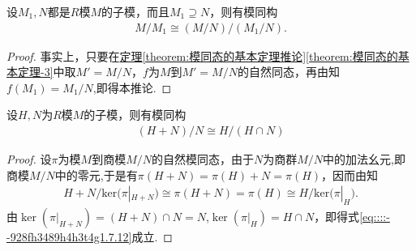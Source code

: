 \documentclass[../../main.tex]{subfiles}%
\begin{document}
\begin{corollary}
设$M_1, N$都是$R$模$M$的子模，而且$M_1 \supseteq N$，则有模同构\begin{align*}
M/M_1\cong (M/N)/(M_1/N).
\end{align*}
\end{corollary}
\begin{proof}

事实上，只要在\hyperref[theorem:模同态的基本定理推论]{定理\ref{theorem:模同态的基本定理推论}\ref{theorem:模同态的基本定理-3}}中取$M' = M/N$，$f$为$M$到$M' = M/N$的自然同态，再由知$f(M_1)=M_1/N$,即得本推论.

\end{proof}

\begin{theorem}
设$H, N$为$R$模$M$的子模，则有模同构
\begin{align}
(H + N)/N \cong H/(H \cap N) \label{eq::::--928fh3489h4h3t4g1.7.12}
\end{align}
\end{theorem}

\begin{proof}

设$\pi$为模$M$到商模$M/N$的自然模同态，由于$N$为商群$M/N$中的加法幺元,即商模$M/N$中的零元,于是有$\pi(H + N) =\pi(H)+N= \pi(H)$，因而由知
\begin{align*}
H+N/\mathrm{ker(}\pi |_{H+N})\cong \pi \left( H+N \right) =\pi \left( H \right) \cong H/\mathrm{ker(}\pi |_H).
\end{align*}
由$\ker(\pi|_{H + N}) = (H + N)\cap N =N$,$\ker(\pi|_H) = H \cap N$，即得式\eqref{eq::::--928fh3489h4h3t4g1.7.12}成立.

\end{proof}
\end{document}
